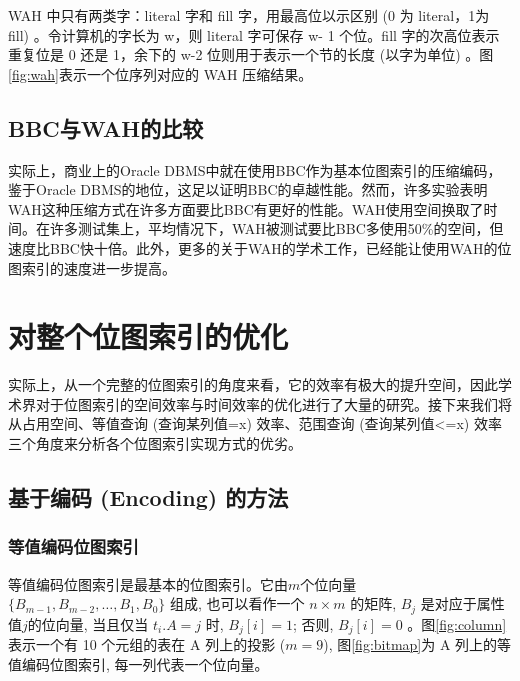 \documentclass[11pt, a4paper]{article}
\begin{document}
  WAH 中只有两类字：literal 字和 fill 字，用最高位以示区别 (0 为 literal，1为 fill) 。令计算机的字长为 w，则 literal 字可保存 w- 1 个位。fill 字的次高位表示重复位是 0 还是 1，余下的 w-2 位则用于表示一个节的长度 (以字为单位) 。图\ref{fig:wah}表示一个位序列对应的 WAH 压缩结果。

  \subsection{BBC与WAH的比较}

  实际上，商业上的Oracle DBMS中就在使用BBC作为基本位图索引的压缩编码，鉴于Oracle DBMS的地位，这足以证明BBC的卓越性能。然而，许多实验表明WAH这种压缩方式在许多方面要比BBC有更好的性能。WAH使用空间换取了时间。在许多测试集上，平均情况下，WAH被测试要比BBC多使用50\%的空间，但速度比BBC快十倍。此外，更多的关于WAH的学术工作，已经能让使用WAH的位图索引的速度进一步提高。

  \section{对整个位图索引的优化}

  实际上，从一个完整的位图索引的角度来看，它的效率有极大的提升空间，因此学术界对于位图索引的空间效率与时间效率的优化进行了大量的研究。接下来我们将从占用空间、等值查询 (查询某列值=x) 效率、范围查询 (查询某列值<=x) 效率三个角度来分析各个位图索引实现方式的优劣。

  \subsection{基于编码 (Encoding) 的方法}

  \subsubsection{等值编码位图索引}

  等值编码位图索引是最基本的位图索引。它由$m$个位向量 $\{B_{m - 1}, B_{m-2}, \ldots, B_1, B_0\}$ 组成, 也可以看作一个 $n\times m$ 的矩阵, $B_j$ 是对应于属性值$j$的位向量, 当且仅当 $t_i.A =j$ 时, $B_j[i] =1$; 否则, $B_j[ i] =0$ 。图\ref{fig:column}表示一个有 10 个元组的表在 A 列上的投影 ($m=9$), 图\ref{fig:bitmap}为 A 列上的等值编码位图索引, 每一列代表一个位向量。
\end{document}
